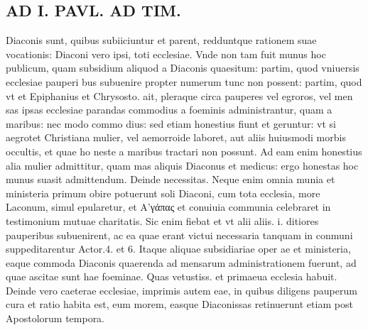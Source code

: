 \documentclass{article}
\begin{document}
\begin{pages}
\section*{AD I. PAVL. AD TIM. }
\marginpar{[ p.272 ]}\pstart Diaconis sunt, quibus subiiciuntur et parent, redduntque rationem suae vocationis: Diaconi vero ipsi, toti ecclesiae. Vnde non tam fuit munus hoc publicum, quam subsidium aliquod a Diaconis quaesitum: partim, quod vniuersis ecclesiae pauperi bus subuenire propter numerum tunc non possent: partim, quod vt et Epiphanius et Chrysosto. ait, pleraque circa pauperes vel egroros, vel men sas ipsas ecclesiae parandas commodius a foeminis administrantur, quam a maribus: nec modo commo dius: sed etiam honestius fiunt et geruntur: vt si aegrotet Christiana mulier, vel aemorroide laboret, aut aliis huiusmodi morbis occultis, et quae ho neste a maribus tractari non possunt. Ad eam enim honestius alia mulier admittitur, quam mas aliquis Diaconus et medicus: ergo honestas hoc munus suasit admittendum. Deinde necessitas. Neque enim omnia munia et ministeria primum obire potuerunt soli Diaconi, cum tota ecclesia, more Laconum, simul epularetur, et Α’γάπας et conuiuia communia celebraret in testimonium mutuae charitatis. Sic enim fiebat et vt alii aliis. i. ditiores pauperibus subuenirent, ac ea quae erant victui necessaria tanquam in conmuni suppeditarentur Actor.4. et 6. Itaque aliquae subsidiariae oper ae et ministeria, eaque commoda Diaconis quaerenda ad mensarum administrationem fuerunt, ad quae ascitae sunt hae foeminae. Quas vetustiss. et primaeua ecclesia habuit. Deinde vero caeterae ecclesiae, imprimis autem eae, in quibus diligens pauperum cura et ratio habita est, eum morem, easque Diaconissas retinuerunt etiam post Apostolorum tempora.  \pend

\end{pages}
\end{document}
